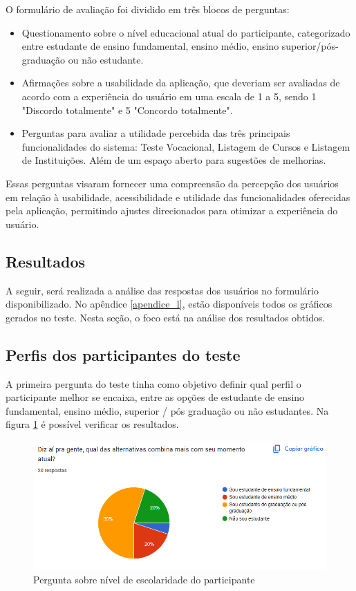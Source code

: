 O formulário de avaliação foi dividido em três blocos de perguntas:

\begin{itemize} 
\item Questionamento sobre o nível educacional atual do participante, categorizado entre estudante de ensino fundamental, ensino médio, ensino superior/pós-graduação ou não estudante. 
\end{itemize} 
\begin{itemize} 
\item Afirmações sobre a usabilidade da aplicação, que deveriam ser avaliadas de acordo com a experiência do usuário em uma escala de 1 a 5, sendo 1 "Discordo totalmente" e 5 "Concordo totalmente". 
\end{itemize} 
\begin{itemize} 
\item Perguntas para avaliar a utilidade percebida das três principais funcionalidades do sistema: Teste Vocacional, Listagem de Cursos e Listagem de Instituições. Além de um espaço aberto para sugestões de melhorias.  
\end{itemize}

Essas perguntas visaram fornecer uma compreensão da percepção dos usuários em relação à usabilidade, acessibilidade e utilidade das funcionalidades oferecidas pela aplicação, permitindo ajustes direcionados para otimizar a experiência do usuário.

\subsection{Resultados}
A seguir, será realizada a análise das respostas dos usuários no formulário disponibilizado. No apêndice \ref{apendice_l}, estão disponíveis todos os gráficos gerados no teste. Nesta seção, o foco está na análise dos resultados obtidos.

\subsection{Perfis dos participantes do teste}
A primeira pergunta do teste tinha como objetivo definir qual perfil o participante melhor se encaixa, entre as opções de estudante de ensino fundamental, ensino médio, superior / pós graduação ou não estudantes. Na figura \ref{fig:nivel} é possível verificar os resultados.

\newpage
\begin{figure}[ht]
        \centering
\includegraphics[width=1.0\textwidth]{images/estudante.png}
        \caption{Pergunta sobre nível de escolaridade do participante}
        \label{fig:nivel}
\end{figure}

